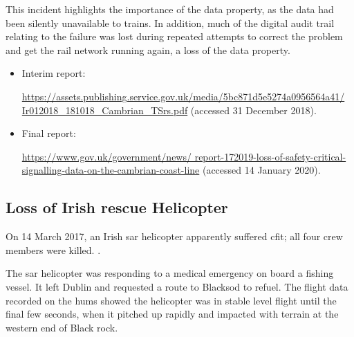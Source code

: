 This incident highlights the importance of the  \gls{data property}, as the data had been silently unavailable to trains. In addition, much of the digital audit trail relating to the failure was lost during repeated attempts to correct the problem and get the rail network running again, a loss of the  \gls{data property}.

\begin{samepage}
\begin{itemize}
\item Interim report: \raggedright{\href{https://assets.publishing.service.gov.uk/media/5bc871d5e5274a0956564a41/Ir012018_181018_Cambrian_TSrs.pdf}{https://assets.publishing.service.gov.uk/media/5bc871d5e5274a0956564a41/ Ir012018\_181018\_Cambrian\_TSrs.pdf} (accessed 31 December 2018).}
\item
  Final report: \raggedright{\href{https://www.gov.uk/government/news/report-172019-loss-of-safety-critical-signalling-data-on-the-cambrian-coast-line}{https://www.gov.uk/government/news/ report-172019-loss-of-safety-critical-signalling-data-on-the-cambrian-coast-line} (accessed 14 January 2020).}
\end{itemize}
\end{samepage}

\subsection{Loss of Irish rescue Helicopter} \label{bkm:incacc:irishsar}
On 14 March 2017, an Irish \gls{sar} helicopter apparently suffered \gls{cfit}; all four crew members were killed. .

The \gls{sar} helicopter was responding to a medical emergency on board a fishing vessel. It left Dublin and requested a route to Blacksod to refuel. The flight data recorded on the \gls{hums} showed the helicopter was in stable level flight until the final few seconds, when it pitched up rapidly and impacted with terrain at the western end of Black rock.

